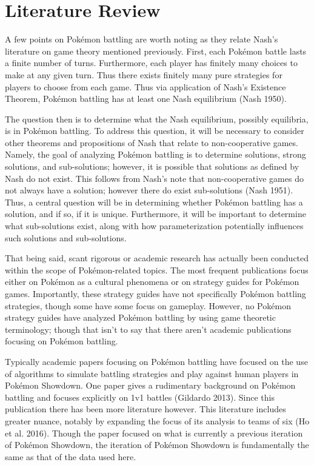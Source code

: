 \documentclass[12pt,twoside]{reedthesis}
\begin{document}
  \section{Literature Review}\label{literature-review}
  
  A few points on Pokémon battling are worth noting as they relate Nash's
  literature on game theory mentioned previously. First, each Pokémon
  battle lasts a finite number of turns. Furthermore, each player has
  finitely many choices to make at any given turn. Thus there exists
  finitely many pure strategies for players to choose from each game. Thus
  via application of Nash's Existence Theorem, Pokémon battling has at
  least one Nash equilibrium (Nash 1950).
  
  The question then is to determine what the Nash equilibrium, possibly
  equilibria, is in Pokémon battling. To address this question, it will be
  necessary to consider other theorems and propositions of Nash that
  relate to non-cooperative games. Namely, the goal of analyzing Pokémon
  battling is to determine solutions, strong solutions, and sub-solutions;
  however, it is possible that solutions as defined by Nash do not exist.
  This follows from Nash's note that non-cooperative games do not always
  have a solution; however there do exist sub-solutions (Nash 1951). Thus,
  a central question will be in determining whether Pokémon battling has a
  solution, and if so, if it is unique. Furthermore, it will be important
  to determine what sub-solutions exist, along with how parameterization
  potentially influences such solutions and sub-solutions.
  
  That being said, scant rigorous or academic research has actually been
  conducted within the scope of Pokémon-related topics. The most frequent
  publications focus either on Pokémon as a cultural phenomena or on
  strategy guides for Pokémon games. Importantly, these strategy guides
  have not specifically Pokémon battling strategies, though some have some
  focus on gameplay. However, no Pokémon strategy guides have analyzed
  Pokémon battling by using game theoretic terminology; though that isn't
  to say that there aren't academic publications focusing on Pokémon
  battling.
  
  Typically academic papers focusing on Pokémon battling have focused on
  the use of algorithms to simulate battling strategies and play against
  human players in Pokémon Showdown. One paper gives a rudimentary
  background on Pokémon battling and focuses explicitly on 1v1 battles
  (Gildardo 2013). Since this publication there has been more literature
  however. This literature includes greater nuance, notably by expanding
  the focus of its analysis to teams of six (Ho et al. 2016). Though the
  paper focused on what is currently a previous iteration of Pokémon
  Showdown, the iteration of Pokémon Showdown is fundamentally the same as
  that of the data used here.
  
\end{document}
